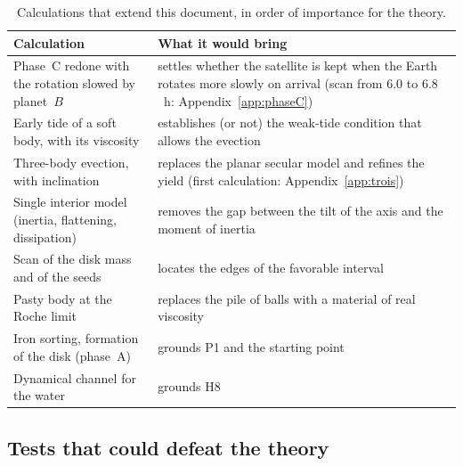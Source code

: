 \documentclass[11pt,a4paper]{article}
\begin{document}
\begin{table}[htbp]
\centering
\caption{Calculations that extend this document, in order of importance for the theory.\label{tab:programme}}
\small
\begin{tabular}{>{\raggedright\arraybackslash}p{5.4cm}>{\raggedright\arraybackslash}p{9.4cm}}
\toprule
Calculation & What it would bring \\
\midrule
Phase~C redone with the rotation slowed by planet~$B$ & settles whether the satellite is kept when the Earth rotates more slowly on arrival (scan from $6.0$ to $6.8$~h: Appendix~\ref{app:phaseC}) \\
Early tide of a soft body, with its viscosity & establishes (or not) the weak-tide condition that allows the evection \\
Three-body evection, with inclination & replaces the planar secular model and refines the yield (first calculation: Appendix~\ref{app:trois}) \\
Single interior model (inertia, flattening, dissipation) & removes the gap between the tilt of the axis and the moment of inertia \\
Scan of the disk mass and of the seeds & locates the edges of the favorable interval \\
Pasty body at the Roche limit & replaces the pile of balls with a material of real viscosity \\
Iron sorting, formation of the disk (phase~A) & grounds P1 and the starting point \\
Dynamical channel for the water & grounds H8 \\
\bottomrule
\end{tabular}
\end{table}

\subsection{Tests that could defeat the theory}
\end{document}
